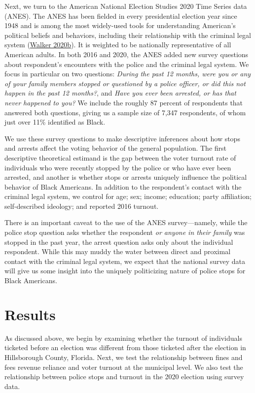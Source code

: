 \documentclass[
  12pt,
]{article}
\begin{document}
Next, we turn to the American National Election Studies 2020 Time Series data (ANES). The ANES has been fielded in every presidential election year since 1948 and is among the most widely-used tools for understanding American's political beliefs and behaviors, including their relationship with the criminal legal system (\protect\hyperlink{ref-Walker2020}{Walker 2020b}). It is weighted to be nationally representative of all American adults. In both 2016 and 2020, the ANES added new survey questions about respondent's encounters with the police and the criminal legal system. We focus in particular on two questions: \emph{During the past 12 months, were you or any of your family members stopped or questioned by a police officer, or did this not happen in the past 12 months?}, and \emph{Have you ever been arrested, or has that never happened to you?} We include the roughly 87 percent of respondents that answered both questions, giving us a sample size of 7,347 respondents, of whom just over 11\% identified as Black.

We use these survey questions to make descriptive inferences about how stops and arrests affect the voting behavior of the general population. The first descriptive theoretical estimand is the gap between the voter turnout rate of individuals who were recently stopped by the police or who have ever been arrested, and another is whether stops or arrests uniquely influence the political behavior of Black Americans. In addition to the respondent's contact with the criminal legal system, we control for age; sex; income; education; party affiliation; self-described ideology; and reported 2016 turnout.

There is an important caveat to the use of the ANES survey---namely, while the police stop question asks whether the respondent \emph{or anyone in their family} was stopped in the past year, the arrest question asks only about the individual respondent. While this may muddy the water between direct and proximal contact with the criminal legal system, we expect that the national survey data will give us some insight into the uniquely politicizing nature of police stops for Black Americans.

\hypertarget{results}{%
\section*{Results}\label{results}}

As discussed above, we begin by examining whether the turnout of individuals ticketed before an election was different from those ticketed after the election in Hillsborough County, Florida.
Next, we test the relationship between fines and fees revenue reliance and voter turnout at the municipal level. We also test the relationship between police stops and turnout in the 2020 election using survey data.
\end{document}
